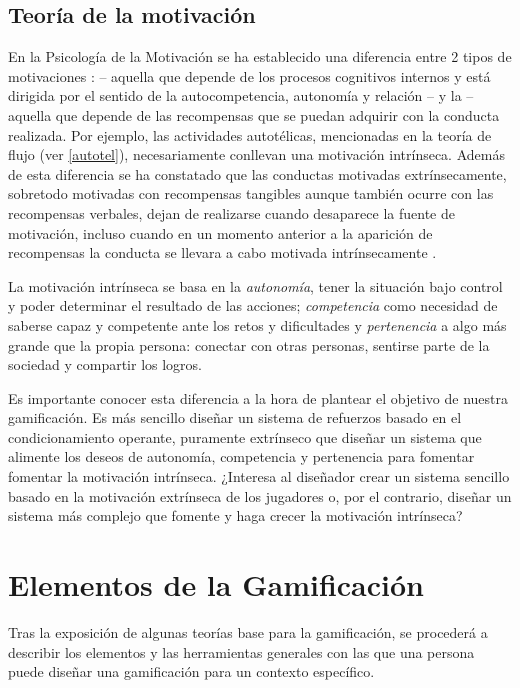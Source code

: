 \subsection{Teoría de la motivación}
\label{SDT}
\label{PosiblesPeligros}
En la Psicología de la Motivación se ha establecido una diferencia entre 2 tipos de motivaciones  \citep{SDT}:   -- aquella que depende de los procesos cognitivos internos y está dirigida por el sentido de la autocompetencia, autonomía y relación -- y la  -- aquella que depende de las recompensas que se puedan adquirir con la conducta realizada.
%
Por ejemplo, las actividades autotélicas, mencionadas en la teoría de flujo (ver \ref{autotel}), necesariamente conllevan una motivación intrínseca.
%
Además de esta diferencia se ha constatado que las conductas motivadas extrínsecamente, sobretodo motivadas con recompensas tangibles aunque también ocurre con las recompensas verbales, dejan de realizarse cuando desaparece la fuente de motivación, incluso cuando en un momento anterior a la aparición de recompensas la conducta se llevara a cabo motivada intrínsecamente
%
 \citep{ExtrinsicEatsIntrinsic}.

La motivación intrínseca se basa en la \textit{autonomía}, tener la situación bajo control y poder determinar el resultado de las acciones; \textit{competencia} como necesidad de saberse capaz y competente ante los retos y dificultades y \textit{pertenencia} a algo más grande que la propia persona: conectar con otras personas, sentirse parte de la sociedad y compartir los logros.


Es importante conocer esta diferencia a la hora de plantear el objetivo de nuestra gamificación. 
%
Es más sencillo diseñar un sistema de refuerzos basado en el condicionamiento operante, puramente extrínseco que diseñar un sistema que alimente los deseos de autonomía, competencia y pertenencia para fomentar fomentar la motivación intrínseca.
%
¿Interesa al diseñador crear un sistema sencillo basado en la motivación extrínseca de los jugadores o, por el contrario, diseñar un sistema más complejo que fomente y haga crecer la motivación intrínseca?



\section{Elementos de la Gamificación}

Tras la exposición de algunas teorías base para la gamificación, se procederá a describir los elementos y las herramientas generales con las que una persona puede diseñar una gamificación para un contexto específico.


